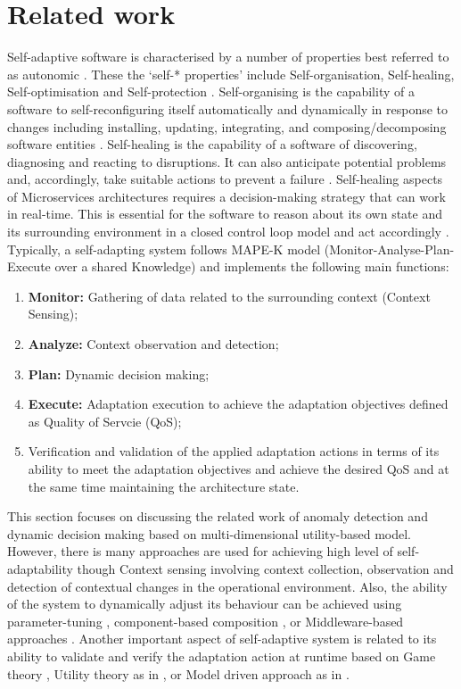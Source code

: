 \section{Related work}
\label{sec:related-work}

Self-adaptive software is characterised by a number of properties best referred to as   autonomic \cite{jelasityself}. These the `self-* properties' include Self-organisation, Self-healing, Self-optimisation and Self-protection  \cite{horn:2001p3735}. Self-organising is the capability of a software to self-reconfiguring itself automatically and dynamically in response to changes including installing, updating, integrating, and composing/decomposing software entities \cite{Salehie:2009p3693}. Self-healing is the capability of a software of discovering, diagnosing and reacting to disruptions. It can also anticipate potential problems and, accordingly, take suitable actions to prevent a failure \cite{horn:2001p3735}. 
Self-healing aspects of Microservices architectures requires a decision-making strategy that can work in real-time. This is essential for the software to reason about its own state and its surrounding environment in a closed control loop model and act accordingly \cite{Cheng:2008p3708}.  
Typically, a self-adapting system follows MAPE-K model (Monitor-Analyse-Plan-Execute over a shared Knowledge) and implements the following main functions: 
\begin{enumerate}
\item  \textbf{Monitor:} Gathering of data related to the surrounding context (Context Sensing);
\item \textbf{Analyze:} Context observation and detection;
\item \textbf{Plan:} Dynamic decision making;
\item  \textbf{Execute:} Adaptation execution to achieve the adaptation objectives defined as Quality of Servcie (QoS);
\item Verification and validation of the applied adaptation actions in terms of its ability to meet the adaptation objectives and achieve the desired QoS and at the same time maintaining the architecture state.
\end{enumerate}

This section focuses on discussing the related work of anomaly detection and dynamic decision making based on multi-dimensional utility-based model. However, there is many approaches are used for achieving high level of self-adaptability though Context sensing involving context collection, observation and detection of contextual changes in the operational environment. Also, the ability of the system to dynamically adjust its behaviour can be achieved using parameter-tuning \cite{Cheng:2009p3902}, component-based composition \cite{MariusMikalsen:2005ur}, or Middleware-based  approaches \cite{CheungFooWo:2007p1692}. Another important aspect of self-adaptive system is related to its ability to validate and verify the adaptation action at runtime based on Game theory \cite{Wei:2016ge}, Utility theory as in \cite{Menasce:2007vq,KonstantinosKakousis:2008ub}, or Model driven approach as in \cite{Sama:2008p3765}.

